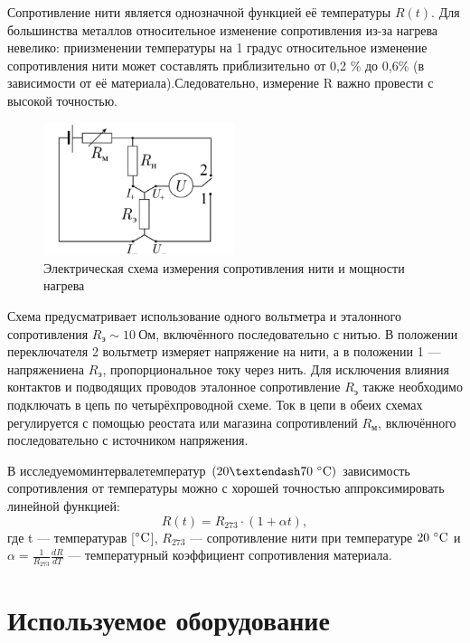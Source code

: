 \documentclass[a4paper, 12pt]{article}
\begin{document}
Сопротивление нити является однозначной функцией её температуры $R(t)$. Для большинства металлов относительное изменение сопротивления из-за нагрева невелико: приизменении температуры на 1 градус относительное изменение сопротивления нити может составлять приблизительно от 0,2 \% до 0,6\% (в зависимости от её материала).Следовательно, измерение R важно провести с высокой точностью.

\begin{figure}
\includegraphics[width=0.5\textwidth]{2.png}
\caption{Электрическая схема измерения сопротивления нити и мощности нагрева}
\label{ris2}
\end{figure}

Схема предусматривает использование одного вольтметра и эталонного сопротивления $R_э\sim10 \: Ом$, включённого последовательно с нитью. В положении переключателя 2 вольтметр измеряет напряжение на нити, а в положении 1 — напряжениена $R_э$, пропорциональное току через нить. Для исключения влияния контактов и подводящих проводов эталонное сопротивление $R_э$ также   необходимо подключать в цепь по четырёхпроводной схеме.
Ток в цепи в обеих схемах регулируется с помощью реостата или магазина сопротивлений $R_м$, включённого последовательно с источником напряжения.

В исследуемоминтервалетемператур $(20–70~\celsius)$ зависимость сопротивления  от температуры можно с хорошей точностью аппроксимировать линейной функцией:
\begin{equation}\label{6}
	R(t) = R_{273} \cdot (1+\alpha t),
\end{equation}
где t — температурав [$\celsius$], $R_{273}$ — сопротивление нити при температуре $20~\celsius$ и \\ $\alpha = \frac{1}{R_{273}}\frac{dR}{dT}$ — температурный коэффициент сопротивления материала.


\section{Используемое оборудование}
\end{document}
